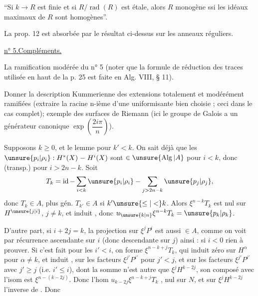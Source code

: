 ``Si $k\to R$ est finie et si $R/\operatorname{rad}(R)$ est étale, alors $R$ monogène ssi les idéaux maximaux de $R$ sont homogènes''.

La prop. 12 est absorbée par le résultat ci-dessus sur les anneaux réguliers.

\uline{n° 5.}\quad \uline{Compléments.}

La ramification modérée du n° 5 (noter que la formule de réduction des traces utilisée en haut de la p. 25 est faite en Alg. VIII, § 11).

Donner la description Kummerienne des extensions totalement et modérément ramifiées (extraire la racine n-ième d'une uniformisante bien choisie ; ceci dans le cas complet); exemple des surfaces de Riemann (ici le groupe de Galois a un générateur canonique $\exp\left(\dfrac{2i\pi}{n}\right)$).



Supposons $k\geq0$, et le lemme  pour $k'<k$. On sait déjà que les $\unsure{p_i|\rho_i}:H^*(X)\mathrel{-}H^i(X)$ sont $\in\unsure{\operatorname{Alg}|A}$ pour $i<k$, donc (transp.) pour $i>2n-k$. Soit
\[
T_k=\operatorname{id}-\sum_{i<k}\unsure{p_i|\rho_i}-\sum_{j>2n-k}\unsure{p_j|\rho_j},
\]
donc $T_k\in A$, plus gén. $T_{k'}\in A$ si $k'\unsure{\leq|<}k$. Alors $\xi^{n-k}T_k$ est nul sur $H^{\unsure{j|i}}$, $j\neq k$, et induit
, donc $u_{\unsure{k|n}}\xi^{n-k}T_k=\unsure{p_k|\rho_k}$.

D'autre part, si $i+2j=k$,  la projection sur $\xi^jP^i$ est aussi $\in A$, comme on voit  par récurrence ascendante sur $i$ (donc descendante sur $j$) ainsi : si $i<0$ rien à prouver. Si c'est fait pour les $i'<i$, on forme $\xi^{n-k+j}T_k$, \deleted{$\unsure{\xi}$} qui induit zéro sur $H^\alpha$ pour $\alpha\neq k$, et induit
,   sur les facteurs $\xi^{j'}P^{i'}$ pour $j'<j$,  et sur les facteurs $\xi^{j'}P^{i'}$ avec $j'\geq j$ (i.e. $i'\leq i$),  dont la somme n'est autre que $\xi^jH^{k-2j}$, son composé avec l'isom
est $\xi^{n-(k-2j)}$. Donc l'hom $u_{k-2j}\xi^{n-k+j}T_k$ , nul sur $N$, et sur $\xi^jH^{k-2j}$ l'inverse de
. Donc

